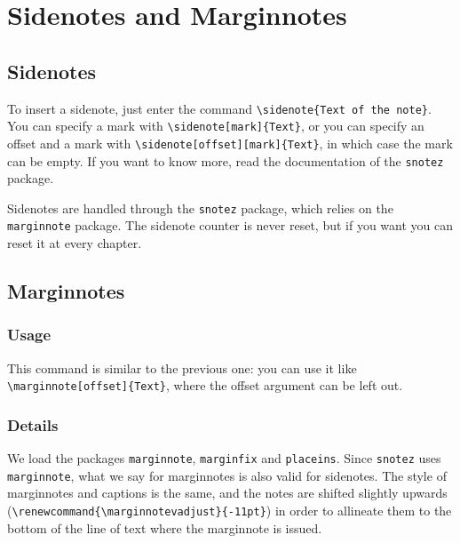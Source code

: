\renewcommand*{\chapterformat}
{
  \enskip\mbox{\scalebox{4}{\thechapter\autodot}}
}
\renewcommand\chapterlinesformat[3]
{
  \parbox[b]{\textwidth+\marginparsep+\marginparwidth}{\hrulefill#2}\par%
  #3%
}
\setchapterpreamble[u]{\margintoc}
\chapter{Sidenotes and Marginnotes}

\section{Sidenotes}

To insert a sidenote, just enter the command \verb|\sidenote{Text of the note}|. You can specify a mark with \verb|\sidenote[mark]{Text}|, or you can specify 
an offset and a mark with \verb|\sidenote[offset][mark]{Text}|, in which 
case the mark can be empty. If you want to know more, read the 
documentation of the \verb|snotez| package.

Sidenotes are handled through the \verb|snotez| package, which relies on 
the \verb|marginnote| package. The sidenote counter is never reset, but 
if you want you can reset it at every chapter.

\section{Marginnotes}

\marginnote{\blindtext}

\subsection{Usage}

This command is similar to the previous one: you can use it like 
\verb|\marginnote[offset]{Text}|, where the offset argument can be left 
out.

\subsection{Details}

We load the packages \verb|marginnote|, \verb|marginfix| and 
\verb|placeins|. Since \verb|snotez| uses \verb|marginnote|, what we say 
for marginnotes is also valid for sidenotes. The style of marginnotes 
and captions is the same, and the notes are shifted slightly upwards 
(\verb|\renewcommand{\marginnotevadjust}{-11pt}|) in order to allineate 
them to the bottom of the line of text where the marginnote is issued.

